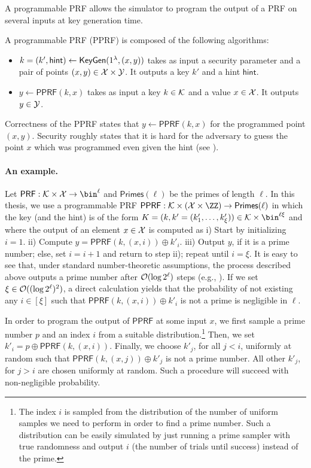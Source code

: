 A programmable PRF allows the simulator to program the output of a PRF on several inputs at key generation time. 

\begin{definition}
\label{def:PPRF}
A programmable PRF (PPRF) is composed of the following algorithms:
\begin{itemize}
    \item $k=(k',\mathsf{hint})\leftarrow\mathsf{KeyGen}(1^\lambda,(x,y))$ takes as input a security parameter and a  pair of points $(x,y)\in\mathcal{X}\times \mathcal{Y}$. It outputs a key $k'$ and a hint $\mathsf{hint}$.
    \item $y\leftarrow\mathsf{PPRF}(k,x)$ takes as input a key $k\in\mathcal{K}$ and a value $x\in\mathcal{X}$. It outputs $y\in\mathcal{Y}$.
\end{itemize}
\end{definition}

Correctness of the PPRF states that $y\leftarrow\mathsf{PPRF}(k,x)$ for the programmed point $(x,y)$. Security roughly states that it is hard for the adversary to guess the point $x$ which was programmed even given the hint (see \cite{CCS:KMPRT17}).


\paragraph{An example.} Let $\mathsf{PRF}:\Kc\times \Xc\to \bin^\ell$ and $\mathsf{Primes}(\ell)$ be the primes of length $\ell$. In this thesis, we use a programmable PRF $\mathsf{PPRF}:\Kc\times (\Xc\times \ZZ)\to \mathsf{Primes}(\ell)$ in which the key (and the hint) is of the form $K=(k,k'=(k'_1,\dots, k'_\xi))\in \Kc\times \bin^{\ell\xi}$ and where the output of an element $x\in\mathcal{X}$ is computed as i) Start by initializing $i=1$. ii) Compute $y=\mathsf{PPRF}(k,(x,i))\oplus k'_i$. iii) Output $y$, if it is a prime number; else, set $i=i+1$ and return to step ii); repeat until $i=\xi$. It is easy to see that, under standard number-theoretic assumptions, the process described above outputs a prime number after $\mathcal{O}(\log 2^\ell)$ steps (e.g., \cite{ICALP:FouTib14}).  
If we set $\xi\in\mathcal{O}((\log 2^\ell)^2)$, a direct calculation yields that the probability of not existing any $i\in [\xi]$ such that $\mathsf{PPRF}(k,(x,i))\oplus k'_i$ is not a prime is negligible in $\ell$.

In order to program the output of $\mathsf{PPRF}$ at some input $x$, we first  sample a prime number $p$ and an index $i$ from a suitable distribution.\footnote{The index $i$ is sampled from the distribution of the number of uniform samples we need to perform in order to find a prime number. Such a distribution can be easily simulated by just running a prime sampler with true randomness and output $i$ (the number of trials until success) instead of the prime.} Then, we set $k'_i=p \oplus \mathsf{PPRF}(k,(x,i))$. Finally, we choose $k'_j$, for all $j<i$,  uniformly at random such that $\mathsf{PPRF}(k,(x,j))\oplus k'_j$ is not a prime number. All other $k'_j$, for $j>i$ are chosen uniformly at random. Such a procedure will succeed with non-negligible probability.

